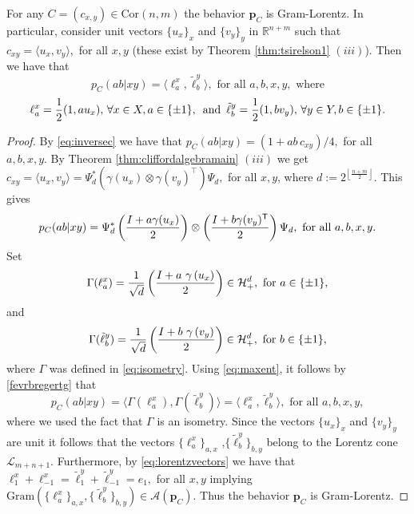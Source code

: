 \documentclass{siamart}
\begin{document}
{\medskip
\begin{lemma}\label{cddfsvdfv}
For any  $C=(c_{x,y})\in {\mathrm{Cor}(n,m)}$ the  behavior ${\mathbf{p}}_C$ is Gram-Lorentz. In particular, consider  unit vectors $\{u_x\}_x$ and $\{v_y\}_{y}$ in ${\mathbb{R}}^{n+m}$ such that $c_{xy}={\langle} u_x,v_y{\rangle},$ for all  $x,y$ (these exist by Theorem \ref{thm:tsirelson1} $(iii)$).  Then we have that
\begin{equation}
p_C(ab|xy)={\langle} \ell^x_a, \tilde{\ell}^y_b{\rangle}, \text{ for all } a,b,x,y, \text{ where}
 \end{equation}
 \begin{equation}\label{eq:lorentzvectors}
\ell^x_a={1\over 2}(1,au_x), \, \forall x\in X, a\in \{\pm1\}, \, \text{ and } \, \tilde{\ell}^y_b={1\over 2}(1, bv_y), \, \forall y\in Y,  b\in \{\pm 1\}.
\end{equation}
\end{lemma}

\begin{proof}
By \eqref{eq:inversec}  we have  that  $p_C(ab|xy)=(1+ab \, c_{xy})/4,$ for all $a,b,x,y$.
By Theorem \ref{thm:cliffordalgebramain} $(iii)$ we get
$c_{xy}={\langle} u_x,v_y{\rangle}=\Psi_d^*\left(\gamma(u_x)\otimes \gamma(v_y)^\top\right)\Psi_d,$ for all $x,y$, where $d:=2^{\left\lfloor \frac{n+m}{2}\right\rfloor}$.
This gives
\begin{equation}\label{fevrbregertg}
p_C(ab|xy)=\Psi_d^*\left({I+a\gamma(u_x)\over 2}\right)\otimes\left( {I+b\gamma(v_y)^{{\sf T}}\over 2}\right)\Psi_d, \text{ for all } a,b,x,y.
\end{equation}
Set  $$\Gamma(\ell^x_a)=
{1\over \sqrt{d}}\left(\frac{I +a\ \gamma\left(u_x\right)}{2} \right) \in {\mathcal{H}}^d_+, \text{ for }   a\in \{\pm 1\},
$$ and
$$\Gamma(\tilde{\ell}^y_b)={1\over \sqrt{d}}\left(\frac{I +b \ \gamma\left(v_y\right)}{2} \right)\in {\mathcal{H}}^d_+, \text{ for }   b\in \{\pm 1\},$$
where $\Gamma$ was defined in  \eqref{eq:isometry}. Using \eqref{eq:maxent}, it follows by \eqref{fevrbregertg} that
\begin{equation}
p_C(ab|xy)= {{\langle} \Gamma(\ell^x_a), \Gamma(\tilde{\ell}^y_b) {\rangle}}={\langle} \ell^x_a, {\tilde{\ell}_b^y} {\rangle}, \text{ for all } a,b,x,y,
\end{equation}
where we used the fact that $\Gamma$ is an isometry.
Since the vectors $\{u_x\}_x$ and $\{v_y\}_{y}$ are unit it follows  that   the vectors {$\{\ell^x_{a}\}_{a,x}$ ,$\{\tilde{\ell}^y_{b}\}_{b,y}$} belong to the Lorentz cone
${\mathcal{L}}_{m+n+1}$. Furthermore,  by \eqref{eq:lorentzvectors} we have  that  $\ell^x_1+\ell^x_{-1}=\tilde{\ell}^y_1+\tilde{\ell}^y_{-1}=e_1,$ for all $x,y$ {implying ${\mathrm{Gram}}(\{\ell^x_{a}\}_{a,x} ,\{\tilde{\ell}^y_{b}\}_{b,y}) \in {\mathcal{A}}({\mathbf{p}}_C)$}.
Thus the behavior ${\mathbf{p}}_C$ is Gram-Lorentz.
\end{proof}

}
\end{document}
